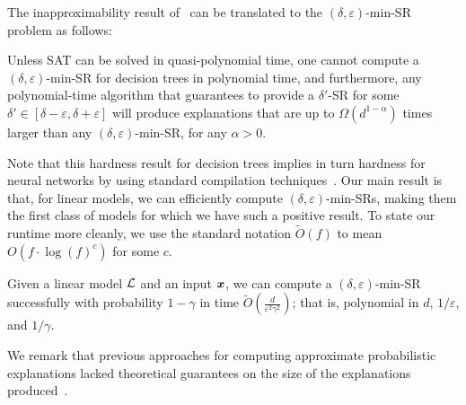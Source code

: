 The inapproximability result of~\citet{Kozachinskiy_2023} can be translated to the $(\delta, \varepsilon)$-min-SR problem as follows:
\begin{theorem}
    Unless \textrm{SAT} can be solved in quasi-polynomial time, one cannot compute a $(\delta, \varepsilon)$-min-SR for decision trees in polynomial time, and furthermore, any polynomial-time algorithm that guarantees to provide a $\delta'$-SR for some $\delta' \in [\delta-\varepsilon, \delta+\varepsilon]$ will produce explanations that are up to $\Omega(d^{1-\alpha})$ times larger than any $(\delta, \varepsilon)$-min-SR, for any $\alpha > 0$.
\end{theorem}
Note that this hardness result for decision trees implies in turn hardness for neural networks by using standard compilation techniques~\citep{NEURIPS2020_b1adda14}.
Our main result is that, for linear models, we can efficiently compute $(\delta, \varepsilon)$-min-SRs, making them the first class of models for which we have such a positive result. To state our runtime more cleanly, we use the standard notation $\widetilde{O}(f)$ to mean $O(f \cdot \log(f)^c)$ for some $c$. 
\begin{theorem}
    \label{prop:smoothed-explanation}
    Given a linear model $\mathcal{L}$ and an input ${\bm{x}}$, we can compute a $(\delta, \varepsilon)$-min-SR successfully with probability $1 - \gamma$ in time $\widetilde{O}\left( \frac{d}{\varepsilon^2\gamma^2}\right)$; that is, polynomial in $d$, $1/\varepsilon$, and $1/\gamma$.
\end{theorem}

We remark that previous approaches for computing approximate probabilistic explanations lacked theoretical guarantees on the size of the explanations produced~\citep{izzaComputingProbabilisticAbductive2023,Izza2021EfficientEW,izza2024locallyminimalprobabilisticexplanations}.



